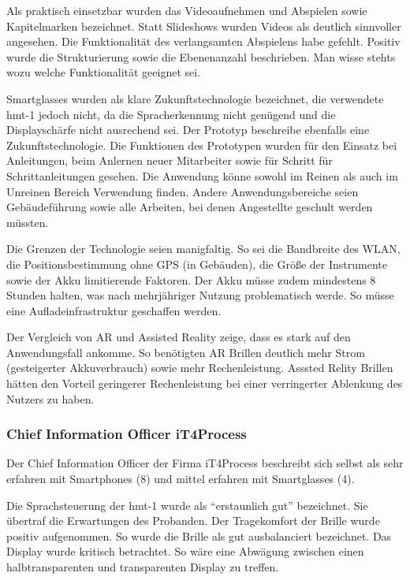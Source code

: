 Als praktisch einsetzbar wurden das Videoaufnehmen und Abspielen sowie Kapitelmarken bezeichnet. Statt Slideshows wurden Videos als deutlich sinnvoller angesehen. Die Funktionalität des verlangsamten Abspielens habe gefehlt. Positiv wurde die Strukturierung sowie die Ebenenanzahl beschrieben. Man wisse stehts wozu welche Funktionalität geeignet sei.

Smartglasses wurden als klare Zukunftstechnologie bezeichnet, die verwendete hmt-1 jedoch nicht, da die Spracherkennung nicht genügend und die Displayschärfe nicht ausrechend sei. Der Prototyp beschreibe ebenfalls eine Zukunftstechnologie. Die Funktionen des Prototypen wurden für den Einsatz bei Anleitungen, beim Anlernen neuer Mitarbeiter sowie für Schritt für Schrittanleitungen gesehen. Die Anwendung könne sowohl im Reinen als auch im Unreinen Bereich Verwendung finden. Andere Anwendungsbereiche seien Gebäudeführung sowie alle Arbeiten, bei denen Angestellte geschult werden müssten. 

Die Grenzen der Technologie seien manigfaltig. So sei die Bandbreite des WLAN, die Positionsbestimmung ohne GPS (in Gebäuden), die Größe der Instrumente sowie der Akku limitierende Faktoren. Der Akku müsse zudem mindestens 8 Stunden halten, was nach mehrjähriger Nutzung problematisch werde. So müsse eine Aufladeinfrastruktur geschaffen werden.

Der Vergleich von AR und Assisted Reality zeige, dass es stark auf den Anwendungsfall ankomme. So benötigten AR Brillen deutlich mehr Strom (gesteigerter Akkuverbrauch) sowie mehr Rechenleistung. Asssted Relity Brillen hätten den Vorteil geringerer Rechenleistung bei einer verringerter Ablenkung des Nutzers zu haben.
%
%
\subsubsection{Chief Information Officer iT4Process}
Der Chief Information Officer der Firma iT4Process beschreibt sich selbst als sehr erfahren mit Smartphones (8) und mittel erfahren mit Smartglasses (4).

Die Sprachsteuerung der hmt-1 wurde als \enquote{erstaunlich gut} bezeichnet. Sie übertraf die Erwartungen des Probanden. Der Tragekomfort der Brille wurde positiv aufgenommen. So wurde die Brille als gut ausbalanciert bezeichnet. Das Display wurde kritisch betrachtet. So wäre eine Abwägung zwischen einen halbtransparenten und transparenten Display zu treffen. 

